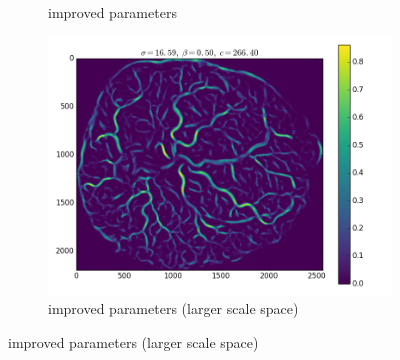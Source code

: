 \documentclass[9pt,notes]{beamer}
\begin{document}
\begin{frame}
\begin{figure}
\begin{subfigure}[t]{0.33\textwidth}
			\caption{improved parameters}
		\end{subfigure}
		\begin{subfigure}[t]{0.33\textwidth}
			\includegraphics[width=\textwidth]{16.png}
			\caption{improved parameters (larger scale space)}
		\end{subfigure}
	\end{figure}

\end{frame}
\end{document}
